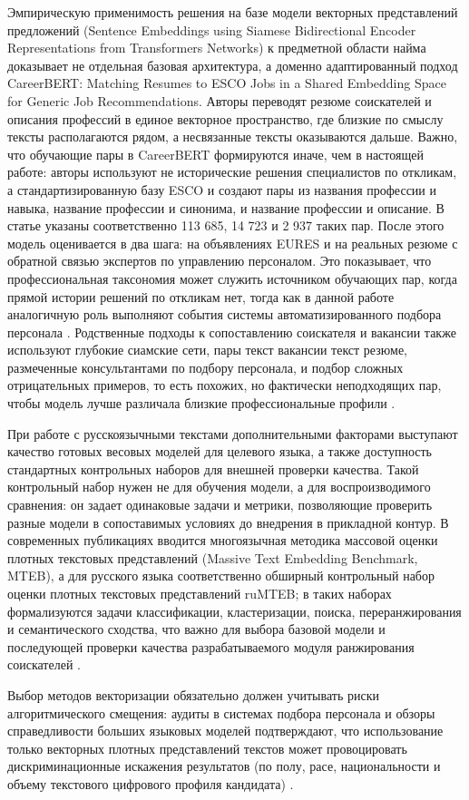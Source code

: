 Эмпирическую применимость решения на базе модели векторных представлений предложений (Sentence Embeddings using Siamese Bidirectional Encoder Representations from Transformers Networks) к предметной области найма доказывает не отдельная базовая архитектура, а доменно адаптированный подход CareerBERT: Matching Resumes to ESCO Jobs in a Shared Embedding Space for Generic Job Recommendations. Авторы переводят резюме соискателей и описания профессий в единое векторное пространство, где близкие по смыслу тексты располагаются рядом, а несвязанные тексты оказываются дальше. Важно, что обучающие пары в CareerBERT формируются иначе, чем в настоящей работе: авторы используют не исторические решения специалистов по откликам, а стандартизированную базу ESCO и создают пары из названия профессии и навыка, название профессии и синонима, и название профессии и описание. В статье указаны соответственно 113 685, 14 723 и 2 937 таких пар. После этого модель оценивается в два шага: на объявлениях EURES и на реальных резюме с обратной связью экспертов по управлению персоналом. Это показывает, что профессиональная таксономия может служить источником обучающих пар, когда прямой истории решений по откликам нет, тогда как в данной работе аналогичную роль выполняют события системы автоматизированного подбора персонала \cite{src01, src30}. Родственные подходы к сопоставлению соискателя и вакансии также используют глубокие сиамские сети, пары текст вакансии текст резюме, размеченные консультантами по подбору персонала, и подбор сложных отрицательных примеров, то есть похожих, но фактически неподходящих пар, чтобы модель лучше различала близкие профессиональные профили \cite{src04, src39, src40}.\par
При работе с русскоязычными текстами дополнительными факторами выступают качество готовых весовых моделей для целевого языка, а также доступность стандартных контрольных наборов для внешней проверки качества. Такой контрольный набор нужен не для обучения модели, а для воспроизводимого сравнения: он задает одинаковые задачи и метрики, позволяющие проверить разные модели в сопоставимых условиях до внедрения в прикладной контур. В современных публикациях вводится многоязычная методика массовой оценки плотных текстовых представлений (Massive Text Embedding Benchmark, MTEB), а для русского языка соответственно обширный контрольный набор оценки плотных текстовых представлений ruMTEB; в таких наборах формализуются задачи классификации, кластеризации, поиска, переранжирования и семантического сходства, что важно для выбора базовой модели и последующей проверки качества разрабатываемого модуля ранжирования соискателей \cite{src19, src20, src29}.\par
Выбор методов векторизации обязательно должен учитывать риски алгоритмического смещения: аудиты в системах подбора персонала и обзоры справедливости больших языковых моделей подтверждают, что использование только векторных плотных представлений текстов может провоцировать дискриминационные искажения результатов (по полу, расе, национальности и объему текстового цифрового профиля кандидата) \cite{src21, src22}.\par
